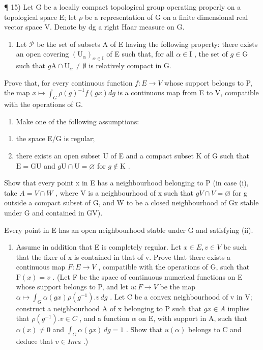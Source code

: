 ¶ 15) Let G be a locally compact topological group operating properly on a topological space E; let \(\rho\) be a representation of G on a finite dimensional real vector space V. Denote by dg a right Haar measure on G.

\begin{enumerate}
\def\labelenumi{\alph{enumi})}
\tightlist
\item
  Let \(\mathcal{P}\) be the set of subsets A of E having the following property: there exists an open covering \((\mathrm{U}_{\alpha})_{\alpha \in \mathrm{I}}\) of E such that, for all \(\alpha \in \mathrm{I}\) , the set of \(g \in \mathrm{G}\) such that \(g\mathrm{A} \cap \mathrm{U}_{\alpha} \neq \emptyset\) is relatively compact in G.
\end{enumerate}

Prove that, for every continuous function \(f: E \to V\) whose support belongs to P, the map \(x \mapsto \int_{G} \rho(g)^{-1} f(gx) dg\) is a continuous map from E to V, compatible with the operations of G.

\begin{enumerate}
\def\labelenumi{\alph{enumi})}
\setcounter{enumi}{1}
\tightlist
\item
  Make one of the following assumptions:
\end{enumerate}

\begin{enumerate}
\def\labelenumi{(\roman{enumi})}
\item
  the space E/G is regular;
\item
  there exists an open subset U of E and a compact subset K of G such that \(\mathrm{E} = \mathrm{GU}\) and \(g\mathrm{U}\cap \mathrm{U} = \varnothing\) for \(g\notin \mathrm{K}\) .
\end{enumerate}

Show that every point x in E has a neighbourhood belonging to P (in case (i), take \(A = V \cap W\) , where V is a neighbourhood of x such that \(gV \cap V = \varnothing\) for g outside a compact subset of G, and W to be a closed neighbourhood of Gx stable under G and contained in GV).

Every point in E has an open neighbourhood stable under G and satisfying (ii).

\begin{enumerate}
\def\labelenumi{\alph{enumi})}
\setcounter{enumi}{2}
\tightlist
\item
  Assume in addition that E is completely regular. Let \(x \in E, v \in V\) be such that the fixer of x is contained in that of v. Prove that there exists a continuous map \(F : E \to V\) , compatible with the operations of G, such that \(\mathrm{F}(x) = v\) . (Let F be the space of continuous numerical functions on E whose support belongs to P, and let \(u : F \to V\) be the map \(\alpha \mapsto \int_{G} \alpha(gx) \rho(g^{-1}). v \, dg\) . Let C be a convex neighbourhood of v in V; construct a neighbourhood A of x belonging to P such that \(gx \in A\) implies that \(\rho(g^{-1}). v \in C\) , and a function \(\alpha\) on E, with support in A, such that \(\alpha(x) \neq 0\) and \(\int_{G} \alpha(gx) \, dg = 1\) . Show that \(u(\alpha)\) belongs to C and deduce that \(v \in Im u\) .)
\end{enumerate}

